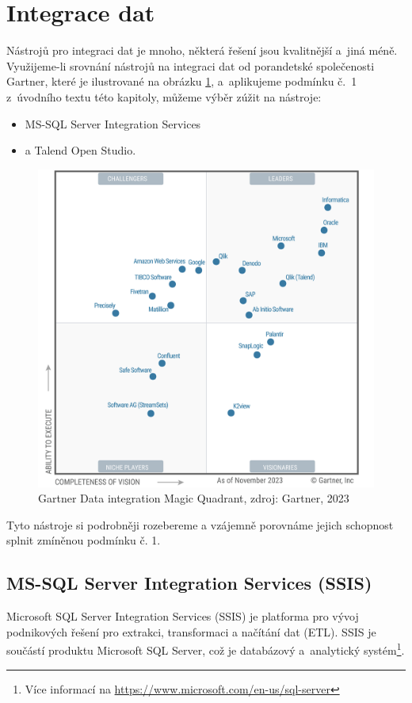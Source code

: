 \section{Integrace dat}\label{sec:DatInteg}

Nástrojů pro integraci dat je mnoho, některá řešení jsou kvalitnější a~jiná méně.
Využijeme-li srovnání nástrojů na integraci dat od porandetské společenosti Gartner\cite{FIG:DatInteg}, které je ilustrované na obrázku \ref{fig:datInteg}, a~aplikujeme podmínku č.~1 z~úvodního textu této kapitoly, můžeme výběr zúžit na nástroje:
\begin{itemize}
    \item MS-SQL Server Integration Services
    \item a Talend Open Studio.
\end{itemize}

\begin{figure}
    \centering
    \includegraphics[width=0.75\linewidth]{img/gartner-data-integration.png}
    \caption{Gartner Data integration Magic Quadrant, zdroj: Gartner, 2023}
    \label{fig:datInteg}
\end{figure}

Tyto nástroje si podrobněji rozebereme a vzájemně porovnáme jejich schopnost splnit zmíněnou podmínku č. 1.

\subsection{MS-SQL Server Integration Services (SSIS)}

Microsoft SQL Server Integration Services (SSIS) je platforma pro vývoj podnikových řešení pro extrakci, transformaci a načítání dat (ETL). SSIS je součástí produktu Microsoft SQL Server, což je databázový a~analytický systém\footnote{Více informací na \url{https://www.microsoft.com/en-us/sql-server}}.

